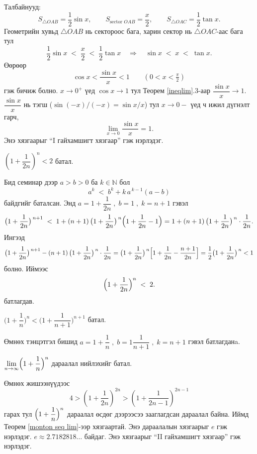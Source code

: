 \begin{example}
Талбайнууд:
\[
S_{\triangle OAB}=\frac12\sin x,\qquad
S_{\text{sector }OAB}=\frac{x}{2},\qquad
S_{\triangle OAC}=\frac12\tan x.
\]
Геометрийн хувьд $\triangle OAB$ нь сектороос бага, харин сектор нь $\triangle OAC$-аас бага тул
\[
\frac12\sin x\;<\;\frac{x}{2}\;<\;\frac12\tan x
\quad\Longrightarrow\quad
\sin x\;<\;x\;<\;\tan x.
\]
Өөрөөр 
\[
\cos x<\frac{\sin x}{x}<1 \qquad (0<x<\tfrac{\pi}{2})
\] гэж бичиж болно.
$x\to 0^+$ үед $\cos x\to 1$ тул Теорем \ref{ineqlim}.3-аар $\dfrac{\sin x}{x}\to 1$. $\dfrac{\sin x}{x}$ нь тэгш ($\sin(-x)/(-x)=\sin x/x$) тул $x\to 0-$ үед ч ижил дүгнэлт гарч,
\[
\lim_{x\to 0}\frac{\sin x}{x}=1.
\] Энэ хязгаарыг “I гайхамшигт хязгаар” гэж нэрлэдэг.
\end{example}
\begin{example}
    $(1+\dfrac{1}{2n})^n<2$ батал.

Бид семинар дээр $a>b>0$ ба $k\in\mathbb{N}$ бол 
\[
a^k \;<\;b^k+ k\,a^{\,k-1}(a-b)
\] байдгийг баталсан. Энд $a=1+\dfrac{1}{2n}  \;, \; b=1 \;, \;k=n+1$ гэвэл \[
\bigl( 1+\dfrac{1}{2n}\bigr) ^{\,n+1} \;<\; 1+(n+1)\,\bigl(1+\dfrac{1}{2n}\bigr)^{\,n}\Bigl(1+\dfrac{1}{2n}-1\Bigr)=1+(n+1)\,\bigl(1+\dfrac{1}{2n}\bigr)^{\,n}\cdot \frac{1}{2n}.
\]
Ингээд
\[
\bigl( 1+\dfrac{1}{2n}\bigr) ^{\,n+1}-(n+1)\,\bigl(1+\dfrac{1}{2n}\bigr)^{\,n}\cdot \frac{1}{2n}=\bigl(1+\dfrac{1}{2n}\bigr)^{\,n}\Bigl[1+\dfrac{1}{2n}-\dfrac{n+1}{2n}\Bigr] =\dfrac{1}{2}\bigl(1+\dfrac{1}{2n}\bigr)^{\,n}<1
\]
болно. Иймээс
\[
\Bigl(1+\frac{1}{2n}\Bigr)^{n} \;<\;2.
\]
батлагдав.
\end{example}
\begin{example}
    $\bigl(1+\dfrac{1}{n}\bigr)^n<\bigl(1+\dfrac{1}{n+1}\bigr)^{n+1}$ батал.

Өмнөх тэнцэтгэл бишид $a=1+\dfrac{1}{n}  \;, \; b=1\dfrac{1}{n+1} \;, \;k=n+1$ гэвэл батлагданa. 
\end{example}
\begin{example}
     $\lim\limits_{n\to\infty}\Bigl(1+\dfrac{1}{n}\Bigr)^n$ дараалал нийлэхийг батал.

Өмнөх жишээнүүдээс $$4>(1+\dfrac{1}{2n})^{2n}>(1+\dfrac{1}{2n-1})^{2n-1}$$ гарах тул $\Bigl(1+\dfrac{1}{n}\Bigr)^n$ дараалал өсдөг дээрээсээ зааглагдсан дараалал байна. Иймд Теорем \ref{monton seq lim}-ээр хязгаартай. Энэ дараалалын хязгаарыг $e$ гэж нэрлэдэг.  $e\approx 2.7182818\dots$ байдаг.
     Энэ хязгаарыг “II гайхамшигт хязгаар” гэж нэрлэдэг.
\end{example}
